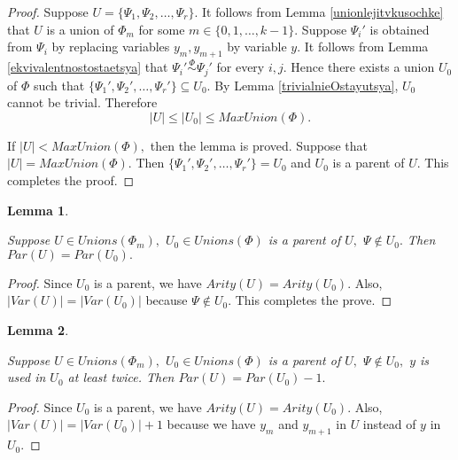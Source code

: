 \documentclass{au}
\theoremstyle{plain}
\newtheorem{lemma}{Lemma}
\theoremstyle{definition}
\theoremstyle{remark}
\numberwithin{equation}{section}
\begin{document}
\begin{proof}

Suppose $U = \{\Psi_{1},\Psi_{2},\ldots,\Psi_{r}\}.$
It follows from Lemma \ref{unionlejitvkusochke} that
$U$ is a union of $\Phi_{m}$
for some $m\in\{0,1,\ldots,k-1\}.$
Suppose $\Psi_{i}'$ is obtained from $\Psi_{i}$
by replacing variables $y_{m},y_{m+1}$ by variable $y.$
It follows from Lemma \ref{ekvivalentnostostaetsya} that
$\Psi_{i}'\overset{\Phi}\sim \Psi_{j}'$ for every $i,j.$
Hence there exists a union $U_{0}$ of $\Phi$
such that $\{\Psi_{1}',\Psi_{2}',\ldots,\Psi_{r}'\}\subseteq U_{0}.$
By Lemma \ref{trivialnieOstayutsya}, $U_{0}$ cannot be trivial.
Therefore 
$$|U| \le |U_{0}| \le MaxUnion(\Phi).$$

If $|U| < MaxUnion(\Phi),$ then the lemma is proved.
Suppose that $|U| = MaxUnion(\Phi).$
Then $\{\Psi_{1}',\Psi_{2}',\ldots,\Psi_{r}'\}= U_{0}$
and $U_{0}$ is a parent of $U.$
This completes the proof.

\end{proof}

\begin{lemma}\label{UnionNeSoderjitPsi}

Suppose $U\in Unions(\Phi_{m}),$
$U_{0}\in Unions(\Phi)$ is a parent of $U,$
$\Psi\notin U_{0}.$
Then $Par(U) = Par(U_{0}).$

\end{lemma}

\begin{proof}

Since $U_{0}$ is a parent, we have
$Arity(U) = Arity(U_{0}).$
Also, $|Var(U)|= |Var(U_{0})|$ because $\Psi\notin U_{0}.$
This completes the prove.

\end{proof}

\begin{lemma}\label{UnionSoderjitPsi}

Suppose $U\in Unions(\Phi_{m}),$
$U_{0}\in Unions(\Phi)$ is a parent of $U,$
$\Psi\notin U_{0},$
$y$ is used in $U_{0}$ at least twice.
Then $Par(U) = Par(U_{0})-1.$

\end{lemma}

\begin{proof}

Since $U_{0}$ is a parent, we have
$Arity(U) = Arity(U_{0}).$
Also, $|Var(U)|= |Var(U_{0})|+1$
because we have $y_{m}$ and $y_{m+1}$ in $U$ instead of $y$ in $U_{0}.$

\end{proof}
\end{document}

